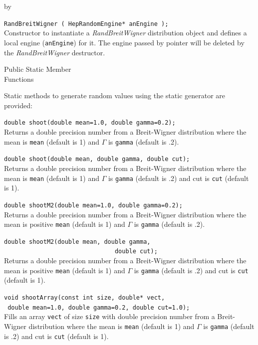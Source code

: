 \documentclass[twoside]{article}
\newcommand{\comp}[1]{\texttt{#1}}%
\newcommand{\entrylabel}[1]{\mbox{\textbf{{#1}}}\hfil}%
\newenvironment{entry}
{\begin{list}{}%
    {\renewcommand{\makelabel}{\entrylabel}%
     \setlength{\labelwidth}{90pt}%
     \setlength{\leftmargin}{\labelwidth}
     \advance\leftmargin by \labelsep%
      }%
    }%
  {\end{list}}
\newcommand{\Entrylabel}[1]%
{\raisebox{0pt}[1ex][0pt]{\makebox[\labelwidth][l]%
    {\parbox[t]{\labelwidth}{\hspace{0pt}\textbf{{#1}}}}}}
\newenvironment{Entry}%
{\renewcommand{\entrylabel}{\Entrylabel}\begin{entry}}%
  {\end{entry}}
\begin{document}
\begin{description}
\begin{Entry}
    \verb+RandBreitWigner ( HepRandomEngine* anEngine );+\\
    Constructor to instantiate a {\em RandBreitWigner}
    distribution object and defines a local engine (\comp{anEngine})
    for it.  The engine passed by pointer will be deleted
    by the {\em RandBreitWigner} destructor.

\item[Public Static Member\\ Functions]
  
    Static methods to generate random values using the static generator
    are provided:

    \verb+double shoot(double mean=1.0, double gamma=0.2);+\\
    Returns a double precision number from a Breit-Wigner
    distribution where the mean is \comp{mean} (default is 1)
    and $\Gamma$ is \comp{gamma} (default is .2).
    
    \verb+double shoot(double mean, double gamma, double cut);+\\
    Returns a double precision number from a Breit-Wigner
    distribution where the mean is \comp{mean} (default is 1)
    and $\Gamma$ is \comp{gamma} (default is .2) and cut is
    \comp{cut} (default is 1).
    
    \verb+double shootM2(double mean=1.0, double gamma=0.2);+\\
    Returns a double precision number from a Breit-Wigner
    distribution where the mean is positive \comp{mean} (default is 1)
    and $\Gamma$ is \comp{gamma} (default is .2).
    
    \verb+double shootM2(double mean, double gamma,+\\
    \verb+                               double cut);+\\
    Returns a double precision number from a Breit-Wigner
    distribution where the mean is positive \comp{mean} (default is 1)
    and $\Gamma$ is \comp{gamma} (default is .2) and cut is
    \comp{cut} (default is 1).
    
    \verb+void shootArray(const int size, double* vect,+\\
    \verb+ double mean=1.0, double gamma=0.2, double cut=1.0);+\\
    Fills an array \comp{vect} of size \comp{size} with double
    precision number from a Breit-Wigner
    distribution where the mean is \comp{mean} (default is 1)
    and $\Gamma$ is \comp{gamma} (default is .2) and cut is
    \comp{cut} (default is 1).


\end{Entry}
\end{description}
\end{document}
